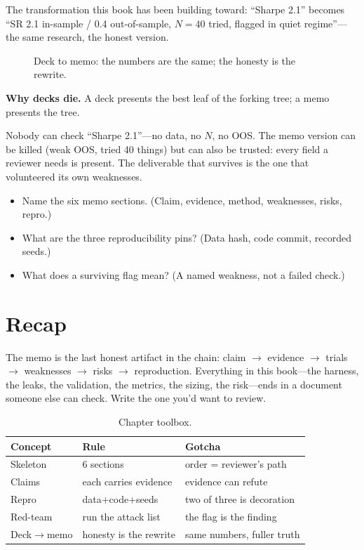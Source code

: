 The transformation this book has been building toward: ``Sharpe 2.1'' becomes
``SR 2.1 in-sample / 0.4 out-of-sample, $N{=}40$ tried, flagged in quiet regime''---the
same research, the honest version.

\begin{figure}[htbp]\centering

\caption{Deck to memo: the numbers are the same; the honesty is the rewrite.}
\label{fig:deck}
\end{figure}

\begin{example}\label{ex:deck}
\textbf{Why decks die.} A deck presents the best leaf of the forking tree; a memo presents
the tree.
\begin{solution}
Nobody can check ``Sharpe 2.1''---no data, no $N$, no OOS. The memo version can be
killed (weak OOS, tried 40 things) but can also be trusted: every field a reviewer
needs is present. The deliverable that survives is the one that volunteered its own
weaknesses.
\end{solution}
\end{example}

\begin{checkpoint}
\begin{itemize}
\item Name the six memo sections. (Claim, evidence, method, weaknesses, risks, repro.)
\item What are the three reproducibility pins? (Data hash, code commit, recorded seeds.)
\item What does a surviving flag mean? (A named weakness, not a failed check.)
\end{itemize}
\end{checkpoint}

\section{Recap}\label{sec:wurecap}

The memo is the last honest artifact in the chain: claim $\to$ evidence $\to$ trials
$\to$ weaknesses $\to$ risks $\to$ reproduction. Everything in this book---the harness,
the leaks, the validation, the metrics, the sizing, the risk---ends in a document
someone else can check. Write the one you'd want to review.

\begin{table}[htbp]\centering\small
\caption{Chapter toolbox.}
\begin{tabular}{@{}lll@{}}
\toprule
Concept & Rule & Gotcha\\
\midrule
Skeleton & 6 sections & order = reviewer's path\\
Claims & each carries evidence & evidence can refute\\
Repro & data+code+seeds & two of three is decoration\\
Red-team & run the attack list & the flag is the finding\\
Deck$\to$memo & honesty is the rewrite & same numbers, fuller truth\\
\bottomrule
\end{tabular}
\end{table}

